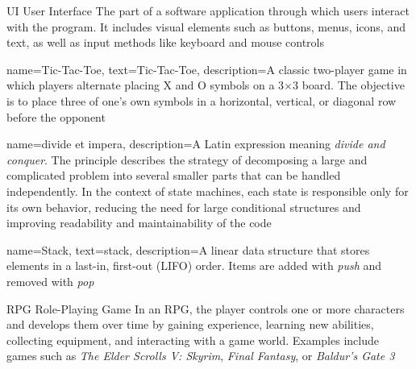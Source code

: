 	{UI}            %
	{User Interface}         %
	{The part of a software application through which users interact with the program. It includes visual elements such as buttons, menus, icons, and text, as well as input methods like keyboard and mouse controls} %


{
	name={Tic-Tac-Toe},
	text={Tic-Tac-Toe},
	description={A classic two-player game in which players alternate placing X and O symbols on a 3×3 board. The objective is to place three of one's own symbols in a horizontal, vertical, or diagonal row before the opponent}
}

{
	name={divide et impera},
	description={A Latin expression meaning \emph{divide and conquer}. The principle describes the strategy of decomposing a large and complicated problem into several smaller parts that can be handled independently. In the context of state machines, each state is responsible only for its own behavior, reducing the need for large conditional structures and improving readability and maintainability of the code}
}

{
	name={Stack},
	text={stack},
	description={A linear data structure that stores elements in a last-in, first-out (LIFO) order. Items are added with \textit{push} and removed with \textit{pop}}
}


	{RPG}            %
	{Role-Playing Game}  %
	{In an RPG, the player controls one or more characters and develops them over time by gaining experience, learning new	abilities, collecting equipment, and interacting with a game world. Examples include games such as \emph{The Elder Scrolls V: Skyrim}, \emph{Final Fantasy},	or \emph{Baldur's Gate 3}} %




